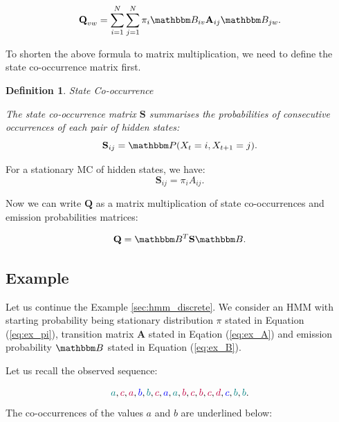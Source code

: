 \documentclass[shortabstract]{iithesis}
\newtheorem{definition}{Definition}
\begin{document}
\begin{equation}\label{eq:omega_gt}
    \textbf{Q}_{vw} = \sum_{i =1}^N \sum_{j =1}^N \pi_i \mathbbm B_{iv} \textbf{A}_{ij}  \mathbbm B_{jw}\text{.}
\end{equation}

To shorten the above formula to matrix multiplication, we need to define the state co-occurrence matrix first.

\begin{definition}{State Co-occurrence}

    The state co-occurrence matrix $\textbf{S}$ summarises  the probabilities of consecutive occurrences of each pair of hidden states: 
    \begin{equation*}
        \textbf{S}_{ij} = \mathbbm P(X_t = i, X_{t+1} = j) \text{.}
    \end{equation*}
\end{definition}

For  a stationary MC of hidden states, we have:
    \begin{equation} \label{eq:s_def}
        \textbf{S}_{ij} = \pi_i A_{ij} \text{.}
    \end{equation}


Now we can write $\textbf{Q}$ as a matrix  multiplication of state co-occurrences and emission probabilities matrices:

\begin{equation}\label{eq:cooc_fact}
    \textbf{Q} = \mathbbm B ^T \textbf{S} \mathbbm B\text{.}
\end{equation}

\subsection{Example} \label{sec:cooc_example_disc}

Let us continue the Example \ref{sec:hmm_discrete}. We consider an HMM with starting probability being stationary distribution $\pi$ stated in Equation (\ref{eq:ex_pi}), transition matrix $\textbf{A}$ stated in Eqation  (\ref{eq:ex_A}) and emission probability $\mathbbm B$ stated in Equation  (\ref{eq:ex_B}).

\pagebreak

Let us recall the observed sequence:

$$\textcolor{teal}{a}, \textcolor{purple}{c}, \textcolor{purple}{a}, \textcolor{blue}{b}, \textcolor{teal}{b}, \textcolor{purple}{c}, \textcolor{blue}{a}, \textcolor{teal}{a}, \textcolor{purple}{b}, \textcolor{purple}{c}, \textcolor{purple}{b}, \textcolor{purple}{c}, \textcolor{purple}{d}, \textcolor{blue}{c}, \textcolor{teal}{b}, \textcolor{teal}{b}\text{.}$$
\linebreak
The co-occurrences of the values $a$ and $b$ are underlined below:
\end{document}
